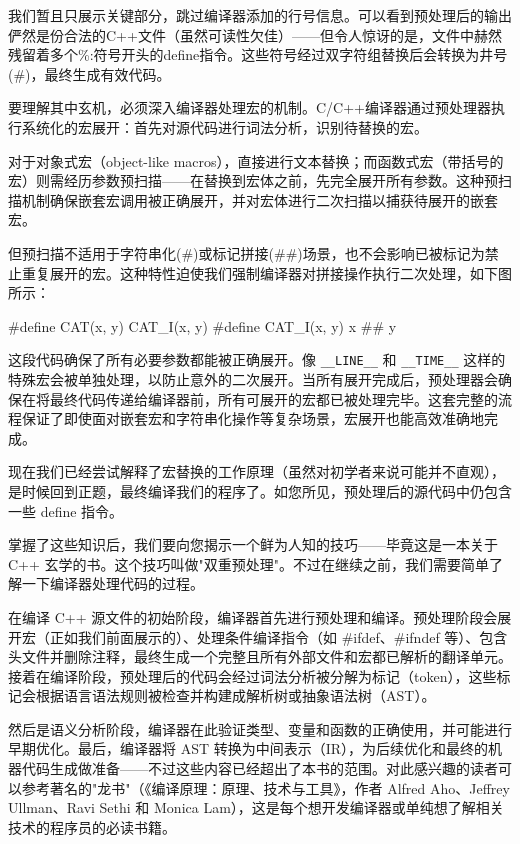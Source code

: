 我们暂且只展示关键部分，跳过编译器添加的行号信息。可以看到预处理后的输出俨然是份合法的C++文件（虽然可读性欠佳）——但令人惊讶的是，文件中赫然残留着多个\%:符号开头的define指令。这些符号经过双字符组替换后会转换为井号(\#)，最终生成有效代码。

要理解其中玄机，必须深入编译器处理宏的机制。C/C++编译器通过预处理器执行系统化的宏展开：首先对源代码进行词法分析，识别待替换的宏。

对于对象式宏（object-like macros），直接进行文本替换；而函数式宏（带括号的宏）则需经历参数预扫描——在替换到宏体之前，先完全展开所有参数。这种预扫描机制确保嵌套宏调用被正确展开，并对宏体进行二次扫描以捕获待展开的嵌套宏。

但预扫描不适用于字符串化(\#)或标记拼接(\#\#)场景，也不会影响已被标记为禁止重复展开的宏。这种特性迫使我们强制编译器对拼接操作执行二次处理，如下图所示：

\begin{cpp}
#define CAT(x, y) CAT_I(x, y)
#define CAT_I(x, y) x ## y
\end{cpp}

这段代码确保了所有必要参数都能被正确展开。像 \verb|__LINE__| 和 \verb|__TIME__| 这样的特殊宏会被单独处理，以防止意外的二次展开。当所有展开完成后，预处理器会确保在将最终代码传递给编译器前，所有可展开的宏都已被处理完毕。这套完整的流程保证了即使面对嵌套宏和字符串化操作等复杂场景，宏展开也能高效准确地完成。

现在我们已经尝试解释了宏替换的工作原理（虽然对初学者来说可能并不直观），是时候回到正题，最终编译我们的程序了。如您所见，预处理后的源代码中仍包含一些 define 指令。

掌握了这些知识后，我们要向您揭示一个鲜为人知的技巧——毕竟这是一本关于 C++ 玄学的书。这个技巧叫做"双重预处理"。不过在继续之前，我们需要简单了解一下编译器处理代码的过程。

在编译 C++ 源文件的初始阶段，编译器首先进行预处理和编译。预处理阶段会展开宏（正如我们前面展示的）、处理条件编译指令（如 \#ifdef、\#ifndef 等）、包含头文件并删除注释，最终生成一个完整且所有外部文件和宏都已解析的翻译单元。接着在编译阶段，预处理后的代码会经过词法分析被分解为标记（token），这些标记会根据语言语法规则被检查并构建成解析树或抽象语法树（AST）。

然后是语义分析阶段，编译器在此验证类型、变量和函数的正确使用，并可能进行早期优化。最后，编译器将 AST 转换为中间表示（IR），为后续优化和最终的机器代码生成做准备——不过这些内容已经超出了本书的范围。对此感兴趣的读者可以参考著名的"龙书"（《编译原理：原理、技术与工具》，作者 Alfred Aho、Jeffrey Ullman、Ravi Sethi 和 Monica Lam），这是每个想开发编译器或单纯想了解相关技术的程序员的必读书籍。

